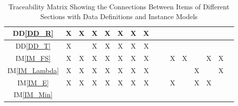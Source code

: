 \documentclass[12pt]{article}
\newcommand{\iref}[1]{IM\ref{#1}}
\newcommand{\ddref}[1]{DD\ref{#1}}
\begin{document}
{\begin{landscape}
\begin{table}[h!]
\begin{tabular}{|c|c|c|c|c|c|c|c|c|c|c|c|c|c|c|c|}
\ddref{DD_R}            & X& X& X& X& X& X& X& & & & & & & & \\ 
\hline
\ddref{DD_T}            & X& & X& X& X& X& X& & & & & & & & \\ 
\hline
\iref{IM_FS}            & X& X& X& X& X& X& X& & & X& X& & X& X& \\ 
\hline
\iref{IM_Lambda}        & X& X& X& X& X& X& X& & & & & X& & X& \\ 
\hline
\iref{IM_E}             & X& X& X& X& X& X& X& & & X& & X& X& & \\ 
\hline
\iref{IM_Min}           & & & & & & & & & & & & & & & \\
\hline
\end{tabular}
\caption{Traceability Matrix Showing the Connections Between Items of Different 
	Sections with Data Definitions and Instance Models}
\label{Table:trace2}
\end{table}
\end{landscape}
}
\end{document}

